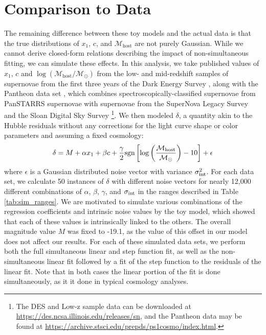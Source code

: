 \section{Comparison to Data}
\label{sec:data_comparison}
The remaining difference between these toy models and the actual data is that the true distributions of $x_1$, $c$, and $\mathcal{M}_\text{host}$ are not purely Gaussian. While we cannot derive closed-form relations describing the impact of non-simultaneous fitting, we can simulate these effects. In this analysis, we take published values of $x_1$, $c$ and $\log(\mathcal{M}_\text{host}/\mathcal{M}_\odot)$ from the low- and mid-redshift samples of supernovae from the first three years of the Dark Energy Survey \cite[][hereafter referred to as the Low-z and DES subsamples]{abbott_first_2019}, along with the Pantheon data set \citep{scolnic_complete_2018}, which combines spectroscopically-classified supernovae from PanSTARRS supernovae \cite[PS1;][]{rest_cosmological_2014, scolnic_color_2014} with supernovae from the SuperNova Legacy Survey \cite[SNLS;][]{conley_supernova_2011, sullivan_snls3_2011} and the Sloan Digital Sky Survey \cite[SDSS;][]{frieman_sloan_2008, kessler_first-year_2009, sako_data_2018} \footnote{The DES and Low-z sample data can be downloaded at \url{https://des.ncsa.illinois.edu/releases/sn}, and the Pantheon data may be found at \url{https://archive.stsci.edu/prepds/ps1cosmo/index.html}.}. We then modeled $\delta$, a quantity akin to the Hubble residuals without any corrections for the light curve shape or color parameters and assuming a fixed cosmology:
\begin{equation}
    \delta= M + \alpha x_1 + \beta c + \frac{\gamma}{2}\text{sgn}\left[\log\left(\frac{\mathcal{M}_\text{host}}{\mathcal{M}_\odot}\right) - 10 \right] + \epsilon
\end{equation}
where $\epsilon$ is a Gaussian distributed noise vector with variance $\sigma_{\text{int}}^2$. For each data set, we calculate 50 instances of $\delta$ with different noise vectors for nearly 12,000 different combinations of $\alpha$, $\beta$, $\gamma$, and $\sigma_{\text{int}}$ in the ranges described in Table \ref{tab:sim_ranges}. We are motivated to simulate various combinations of the regression coefficients and intrinsic noise values by the toy model, which showed that each of these values is intrinsically linked to the others. The overall magnitude value $M$ was fixed to -19.1, as the value of this offset in our model does not affect our results. For each of these simulated data sets, we perform both the full simultaneous linear and step function fit, as well as the non-simultaneous linear fit followed by a fit of the step function to the residuals of the linear fit. Note that in both cases the linear portion of the fit is done simultaneously, as it it done in typical cosmology analyses.


